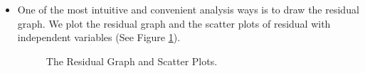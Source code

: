 \documentclass[12pt, a4paper]{article}
\begin{document}
\begin{spacing}{1.5}
\begin{itemize}
\begin{itemize}
\item[1.] One of the most intuitive and convenient analysis ways is to draw the residual graph. We plot the residual graph and the scatter plots of residual with independent variables (See Figure \ref{fig1}).

\begin{figure}[h]
	\centering  
	\caption{The Residual Graph and Scatter Plots.}
	\label{fig1}
\end{figure}


\end{itemize}
\end{itemize}
\end{spacing}
\end{document}
